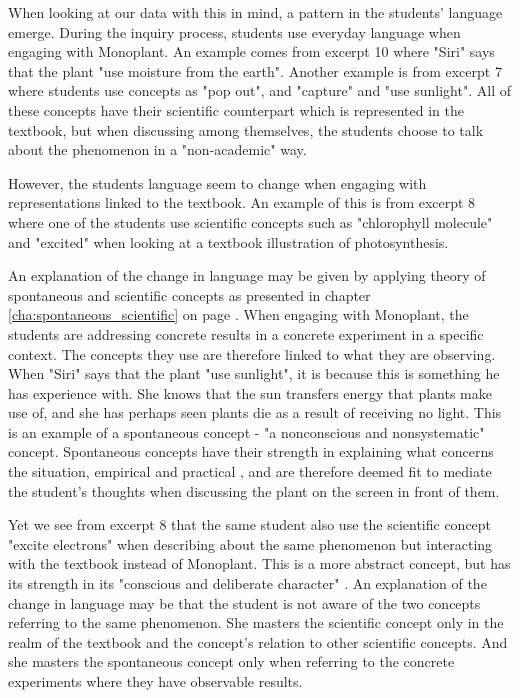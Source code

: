 When looking at our data with this in mind, a pattern in the students' language emerge. During the inquiry process, students use everyday language when engaging with Monoplant. An example comes from excerpt 10 where "Siri" says that the plant "use moisture from the earth". Another example is from excerpt 7 where students use concepts as "pop out", and "capture" and "use sunlight". All of these concepts have their scientific counterpart which is represented in the textbook, but when discussing among themselves, the students choose to talk about the phenomenon in a "non-academic" way. 

However, the students language seem to change when engaging with representations linked to the textbook. An example of this is from excerpt 8 where one of the students use scientific concepts such as "chlorophyll molecule" and "excited" when looking at a textbook illustration of photosynthesis. 

An explanation of the change in language may be given by applying \citet{vygotsky2012thought} theory of spontaneous and scientific concepts as presented in chapter \ref{cha:spontaneous_scientific} on page \pageref{cha:spontaneous_scientific}. When engaging with Monoplant, the students are addressing concrete results in a concrete experiment in a specific context. The concepts they use are therefore linked to what they are observing. When "Siri" says that the plant "use sunlight", it is because this is something he has experience with. She knows that the sun transfers energy that plants make use of, and she has perhaps seen plants die as a result of receiving no light. This is an example of a spontaneous concept \citep{vygotsky2012thought} - "a nonconscious and nonsystematic" concept. Spontaneous concepts have their strength in explaining what concerns the situation, empirical and practical \citep{vygotsky2012thought}, and are therefore deemed fit to mediate the student's thoughts when discussing the plant on the screen in front of them. 


Yet we see from excerpt 8 that the same student also use the scientific concept "excite electrons" when describing about the same phenomenon but interacting with the textbook instead of Monoplant. This is a more abstract concept, but has its strength in its "conscious and deliberate character" \citep{vygotsky2012thought}. An explanation of the change in language may be that the student is not aware of the two concepts referring to the same phenomenon. She masters the scientific concept only in the realm of the textbook and the concept's relation to other scientific concepts. And she masters the spontaneous concept only when referring to the concrete experiments where they have observable results. 

